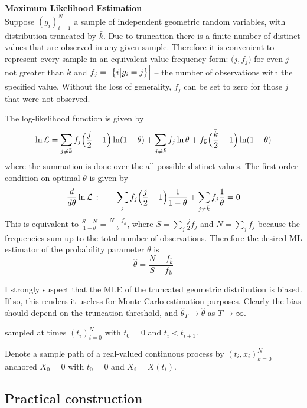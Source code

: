 \noindent \textbf{Maximum Likelihood Estimation} \hfill \\
Suppose ${(g_i)}_{i=1}^N$ a sample of independent geometric random variables, with
distribution truncated by $\bar{k}$. Due to truncation there is a finite number of
distinct values that are observed in any given sample. Therefore it is convenient to
represent every sample in an equivalent value-frequency form: ${\bigl(j, f_j\bigr)}$
for even $j$ not greater than $\bar{k}$ and 
$f_j = \Bigl| \bigl\{ i\bigr\rvert \bigl.g_i = j\bigr\}\Bigr|$ -- the number of
observations with the specified value. Without the loss of generality, $f_j$ can
be set to zero for those $j$ that were not observed.

The log-likelihood function is given by
\[
\ln\mathcal{L}
= \sum_{j\neq \bar{k}} f_j \Bigl(\frac{j}{2}-1\Bigr) \ln(1-\theta)
+ \sum_{j\neq \bar{k}} f_j \ln \theta
+ f_{\bar{k}} \Bigl( \frac{\bar{k}}{2} - 1 \Bigr) \ln(1-\theta)
\]
where the summation is done over the all possible distinct values. The first-order
condition on optimal $\theta$ is given by
\[
\frac{d}{d \theta} \ln\mathcal{L} \,:\quad
-\sum_j f_j \Bigl(\frac{j}{2}-1\Bigr) \frac{1}{1-\theta} + \sum_{j\neq \bar{k}} f_j \frac{1}{\theta} = 0
\]
This is equivalent to $\frac{S-N}{1-\theta} = \frac{N-f_{\bar{k}}}{\theta}$, where
$S = \sum_j \frac{j}{2} f_j$ and $N = \sum_j f_j$ because the frequencies sum up to
the total number of observations. Therefore the desired ML estimator of the probability
parameter $\theta$ is
\[ \hat{\theta} = \frac{N-f_{\bar{k}}}{S-f_{\bar{k}}} \]

I strongly suspect that the MLE of the truncated geometric distribution is biased. If so,
this renders it useless for Monte-Carlo estimation purposes. Clearly the bias should depend
on the truncation threshold, and $\hat{\theta}_T \to \hat{\theta}$ as $T\to \infty$.


sampled at times $(t_i)_{i=0}^N$ with $t_0=0$ and $t_i<t_{i+1}$.

Denote a sample path of a real-valued continuous process by ${(t_i, x_i)}_{k=0}^N$
anchored $X_0 = 0$ with $t_0 = 0$ and $X_i = X(t_i)$.


\subsection{Practical construction} %
\label{sub:practical_construction}

